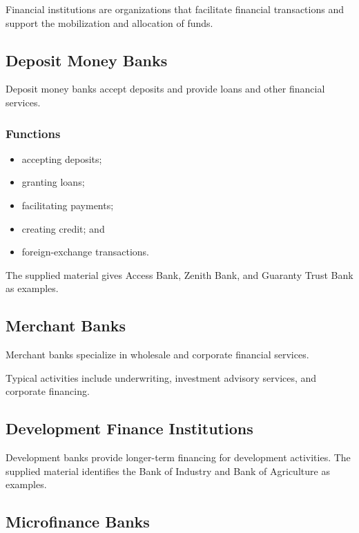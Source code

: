 \documentclass[
]{article}
\providecommand{\tightlist}{%
  \setlength{\itemsep}{0pt}\setlength{\parskip}{0pt}}
\begin{document}
Financial institutions are organizations that facilitate financial transactions and support the mobilization and allocation of funds.

\subsection{Deposit Money Banks}\label{deposit-money-banks}

Deposit money banks accept deposits and provide loans and other financial services.

\subsubsection{Functions}\label{functions}

\begin{itemize}
\tightlist
\item
  accepting deposits;
\item
  granting loans;
\item
  facilitating payments;
\item
  creating credit; and
\item
  foreign-exchange transactions.
\end{itemize}

The supplied material gives Access Bank, Zenith Bank, and Guaranty Trust Bank as examples.

\subsection{Merchant Banks}\label{merchant-banks}

Merchant banks specialize in wholesale and corporate financial services.

Typical activities include underwriting, investment advisory services, and corporate financing.

\subsection{Development Finance Institutions}\label{development-finance-institutions}

Development banks provide longer-term financing for development activities. The supplied material identifies the Bank of Industry and Bank of Agriculture as examples.

\subsection{Microfinance Banks}\label{microfinance-banks}
\end{document}

